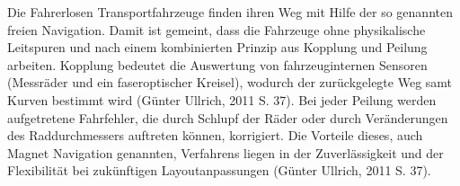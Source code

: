 Die Fahrerlosen Transportfahrzeuge finden ihren Weg mit Hilfe der so genannten freien Navigation.
Damit ist gemeint, dass die Fahrzeuge ohne physikalische Leitspuren und nach einem kombinierten Prinzip aus Kopplung und Peilung arbeiten.
Kopplung bedeutet die Auswertung von fahrzeuginternen Sensoren (Messr\"ader und ein faseroptischer Kreisel), wodurch der zur\"uckgelegte Weg samt Kurven bestimmt wird (G\"unter Ullrich, 2011 S. 37).
Bei jeder Peilung werden aufgetretene Fahrfehler, die durch Schlupf der R\"ader oder durch Ver\"anderungen des Raddurchmessers auftreten k\"onnen, korrigiert.
Die Vorteile dieses, auch Magnet Navigation genannten, Verfahrens liegen in der Zuverl\"assigkeit und der Flexibilit\"at bei zuk\"unftigen Layoutanpassungen (G\"unter Ullrich, 2011 S. 37).